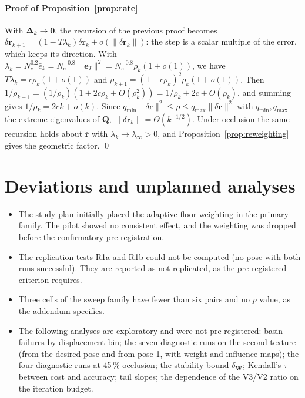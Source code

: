 \documentclass[preprint,12pt]{elsarticle}
\theoremstyle{remark}
\newcommand{\W}{\mathbf{W}}
\newcommand{\e}{\mathbf{e}}
\newcommand{\dr}{\delta\mathbf{r}}
\begin{document}
\paragraph{Proof of Proposition~\ref{prop:rate}}
With $\boldsymbol{\Delta}_{k}\to\mathbf{0}$, the recursion of the previous proof
becomes $\dr_{k+1}=(1-T\lambda_{k})\dr_{k}+o(\lVert\dr_{k}\rVert)$: the step
is a scalar multiple of the error, which keeps its direction. With
$\lambda_{k}=N_{e}^{0.2}\bar e_{k}=N_{e}^{-0.8}\lVert\e_{I}\rVert^{2}=N_{e}^{-0.8}\rho_{k}(1+o(1))$,
we have $T\lambda_{k}=c\rho_{k}(1+o(1))$ and
$\rho_{k+1}=(1-c\rho_{k})^{2}\rho_{k}(1+o(1))$. Then
$1/\rho_{k+1}=(1/\rho_{k})(1+2c\rho_{k}+O(\rho_{k}^{2}))=1/\rho_{k}+2c+O(\rho_{k})$,
and summing gives $1/\rho_{k}=2ck+o(k)$. Since
$q_{\min}\lVert\dr\rVert^{2}\le\rho\le q_{\max}\lVert\dr\rVert^{2}$ with
$q_{\min},q_{\max}$ the extreme eigenvalues of $\mathbf{Q}$,
$\lVert\dr_{k}\rVert=\Theta(k^{-1/2})$. Under occlusion the same recursion
holds about $\bar{\mathbf{r}}$ with $\lambda_{k}\to\lambda_{\infty}>0$, and
Proposition~\ref{prop:reweighting} gives the geometric factor. \qed

\section{Deviations and unplanned analyses}
\label{app:deviations}

\begin{itemize}
\item The study plan initially placed the adaptive-floor weighting in the
  primary family. The pilot showed no consistent effect, and the weighting was
  dropped before the confirmatory pre-registration.
\item The replication tests R1a and R1b could not be computed (no pose with
  both runs successful). They are reported as not replicated, as the
  pre-registered criterion requires.
\item Three cells of the sweep family have fewer than six pairs and no
  $p$ value, as the addendum specifies.
\item The following analyses are exploratory and were not pre-registered:
  basin failures by displacement bin; the seven diagnostic runs on the second
  texture (from the desired pose and from pose 1, with weight and influence
  maps); the four diagnostic runs at 45\,\% occlusion; the stability bound
  $\delta_{\W}$; Kendall's $\tau$ between cost and accuracy; tail slopes; the
dependence of the V3/V2 ratio on the iteration budget.
\end{itemize}



\end{document}
